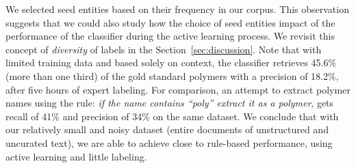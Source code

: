 
We selected seed entities based on their frequency in our corpus. %
This observation suggests that we could also study how the choice of seed entities impact of the performance of the classifier during the active learning process. 
We revisit this concept of \textit{diversity} of labels in the Section~\ref{sec:discussion}. 
Note that with limited training data and based solely on context, the classifier retrieves 45.6\% (more than one third) of the gold standard polymers with a precision of 18.2\%, after five hours of expert labeling. 
For comparison, an attempt to extract polymer names using the rule: 
\textit{if the name contains ``poly'' extract it as a polymer}, gets recall of 41\% and precision of 34\% on the same dataset.
We conclude that with our relatively small and noisy dataset (entire documents of unstructured and uncurated text), we are able to achieve close to rule-based performance, 
using active learning and little labeling.

